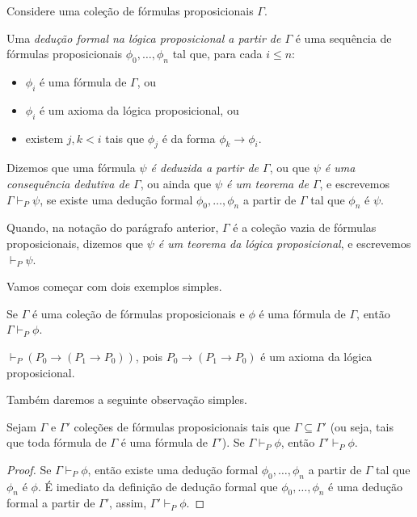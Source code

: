 \begin{metadefinition}\label{mdef:deducoesFormaisLogicaProposicional}
    Considere uma coleção de fórmulas proposicionais $\Gamma$.

    Uma \emph{dedução formal na lógica proposicional a partir de $\Gamma$} é uma sequência de fórmulas proposicionais $\phi_0, \dots, \phi_n$ tal que, para cada $i \leq n$:
    \begin{itemize}
        \item $\phi_i$ é uma fórmula de $\Gamma$, ou
        \item $\phi_i$ é um axioma da lógica proposicional, ou
        \item existem $j, k < i$ tais que $\phi_j$ é da forma $\phi_k \rightarrow \phi_i$.
    \end{itemize}
    
    Dizemos que uma fórmula \emph{$\psi$ é deduzida a partir de $\Gamma$}, ou que \emph{$\psi$ é uma consequência dedutiva de $\Gamma$}, ou ainda que \emph{$\psi$ é um teorema de $\Gamma$}, e escrevemos $\Gamma \vdash_P \psi$, se existe uma dedução formal $\phi_0, \dots, \phi_n$ a partir de $\Gamma$ tal que $\phi_n$ é $\psi$.

    Quando, na notação do parágrafo anterior, $\Gamma$ é a coleção vazia de fórmulas proposicionais, dizemos que \emph{$\psi$ é um teorema da lógica proposicional}, e escrevemos $\vdash_P \psi$.
\end{metadefinition}

Vamos começar com dois exemplos simples.

\begin{example}Se $\Gamma$ é uma coleção de fórmulas proposicionais e $\phi$ é uma fórmula de $\Gamma$, então $\Gamma \vdash_P \phi$.
\end{example}

\begin{example}$\vdash_P (P_0 \rightarrow (P_1 \rightarrow P_0))$, pois $P_0 \rightarrow (P_1 \rightarrow P_0)$ é um axioma da lógica proposicional.
\end{example}

Também daremos a seguinte observação simples.

\begin{metaproposition}\label{metaprop:PCmonotonicidade}Sejam $\Gamma$ e $\Gamma'$ coleções de fórmulas proposicionais tais que $\Gamma \subseteq \Gamma'$ (ou seja, tais que toda fórmula de $\Gamma$ é uma fórmula de $\Gamma'$).
Se $\Gamma \vdash_P \phi$, então $\Gamma' \vdash_P \phi$.
\end{metaproposition}
\begin{proof}Se $\Gamma \vdash_P \phi$, então existe uma dedução formal $\phi_0, \dots, \phi_n$ a partir de $\Gamma$ tal que $\phi_n$ é $\phi$.
É imediato da definição de dedução formal que $\phi_0, \dots, \phi_n$ é uma dedução formal a partir de $\Gamma'$, assim, $\Gamma' \vdash_P \phi$.
\end{proof}

